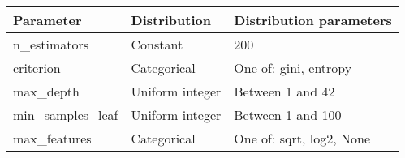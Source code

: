\begin{tabular}{lll}
\toprule
       Parameter &    Distribution &  Distribution parameters \\
\midrule
    n\_estimators &        Constant &                      200 \\
       criterion &     Categorical &    One of: gini, entropy \\
       max\_depth & Uniform integer &         Between 1 and 42 \\
min\_samples\_leaf & Uniform integer &        Between 1 and 100 \\
    max\_features &     Categorical & One of: sqrt, log2, None \\
\bottomrule
\end{tabular}
